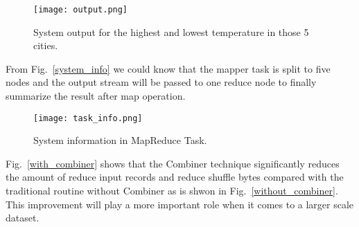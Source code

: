\documentclass[10pt,twocolumn,letterpaper]{article}
\begin{document}
    \begin{figure}[t]
        \begin{center}
           \texttt{[image: output.png]}
        \end{center}
           \caption{System output for the highest and lowest
           temperature in those 5 cities.}
        \label{output}
        \label{fig:long}
        \label{fig:onecol}
    \end{figure}
    
    From Fig.~\ref{system_info} we could know that the mapper task is 
    split to five nodes and the output stream will be passed to one reduce 
    node to finally summarize the result after map operation.
    \begin{figure}[t]
        \begin{center}
           \texttt{[image: task\_info.png]}
        \end{center}
           \caption{System information in MapReduce Task.}
        \label{system_info}
        \label{fig:long}
        \label{fig:onecol}
    \end{figure}

    Fig.~\ref{with_combiner} shows that the Combiner technique significantly
    reduces the amount of reduce input records and reduce shuffle bytes compared
    with the traditional routine without Combiner as is shwon in Fig.~\ref{without_combiner}.
    This improvement will play a more important role when it comes to a larger scale
    dataset.
\end{document}
